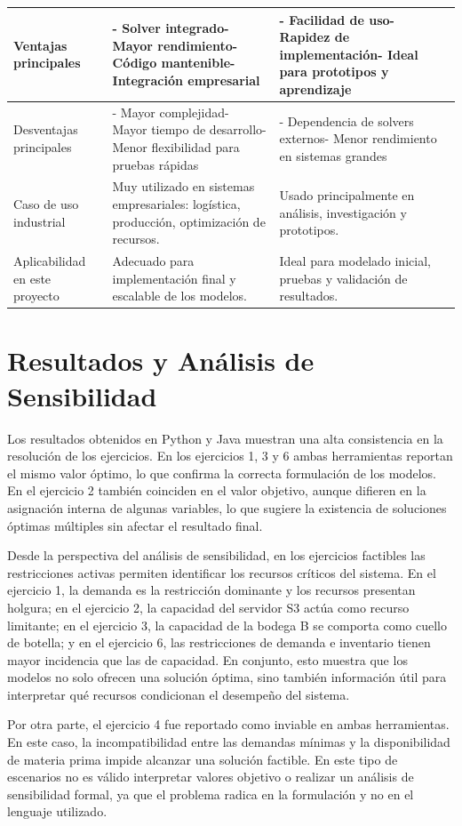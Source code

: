 \documentclass[12pt,a4paper]{article}
\begin{document}
\begin{longtable}{|>{\raggedright\arraybackslash}p{}|>{\raggedright\arraybackslash}p{}|>{\raggedright\arraybackslash}p{}|}
		\hline
		Ventajas principales & - Solver integrado- Mayor rendimiento- Código mantenible- Integración empresarial & - Facilidad de uso- Rapidez de implementación- Ideal para prototipos y aprendizaje \\
		\hline
		Desventajas principales & - Mayor complejidad- Mayor tiempo de desarrollo- Menor flexibilidad para pruebas rápidas & - Dependencia de solvers externos- Menor rendimiento en sistemas grandes \\
		\hline
		Caso de uso industrial & Muy utilizado en sistemas empresariales: logística, producción, optimización de recursos. & Usado principalmente en análisis, investigación y prototipos. \\
		\hline
		Aplicabilidad en este proyecto & Adecuado para implementación final y escalable de los modelos. & Ideal para modelado inicial, pruebas y validación de resultados. \\
		\hline
	\end{longtable}
\normalsize

\section{Resultados y Análisis de Sensibilidad}

Los resultados obtenidos en Python y Java muestran una alta consistencia en la resolución de los ejercicios. En los ejercicios 1, 3 y 6 ambas herramientas reportan el mismo valor óptimo, lo que confirma la correcta formulación de los modelos. En el ejercicio 2 también coinciden en el valor objetivo, aunque difieren en la asignación interna de algunas variables, lo que sugiere la existencia de soluciones óptimas múltiples sin afectar el resultado final.

Desde la perspectiva del análisis de sensibilidad, en los ejercicios factibles las restricciones activas permiten identificar los recursos críticos del sistema. En el ejercicio 1, la demanda es la restricción dominante y los recursos presentan holgura; en el ejercicio 2, la capacidad del servidor S3 actúa como recurso limitante; en el ejercicio 3, la capacidad de la bodega B se comporta como cuello de botella; y en el ejercicio 6, las restricciones de demanda e inventario tienen mayor incidencia que las de capacidad. En conjunto, esto muestra que los modelos no solo ofrecen una solución óptima, sino también información útil para interpretar qué recursos condicionan el desempeño del sistema.

Por otra parte, el ejercicio 4 fue reportado como inviable en ambas herramientas. En este caso, la incompatibilidad entre las demandas mínimas y la disponibilidad de materia prima impide alcanzar una solución factible. En este tipo de escenarios no es válido interpretar valores objetivo o realizar un análisis de sensibilidad formal, ya que el problema radica en la formulación y no en el lenguaje utilizado.
\end{document}

